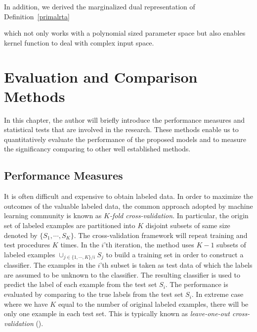 {In addition, we derived the marginalized dual representation of Definition~\ref{primalrta}
\iffalse
\begin{definition}{\bf $L_2$-norm RTA Marginalized Dual.}
	\begin{align*}
		\underset{\vmu\in\Mcal^m}{\maximize} &\quad \frac{1}{|E_\Tcal|}\sum_{e,k,\vu_e}\mu(k,e,\vu_e)   -\frac{1}{2}\sum_{\substack{e,k,\vu_e,\\k',\vu_e'}} \mu(k,e,\vu_e) K_\Tcal^e(x_k,\vu_e;x_k',\vu'_e) \mu(k',e,\vu'_e)\, ,
	\end{align*}
\end{definition}
\fi
which not only works with a polynomial sized parameter space but also enables kernel function to deal with complex input space.



%
\chapter{Evaluation and Comparison Methods} \label{ch_ecm}

In this chapter, the author will briefly introduce the performance measures and statistical tests that are involved in the research. 
These methods enable us to quantitatively evaluate the performance of the proposed models and to measure the significancy comparing to other well established methods.

%
\section{Performance Measures} \label{sc_pm}

It is often difficult and expensive to obtain labeled data. 
In order to maximize the outcomes of the valuable labeled data, the common approach adopted by machine learning community is known as \textit{$K$-fold cross-validation}.
In particular, the origin set of labeled examples are partitioned into $K$ disjoint subsets of same size denoted by $\{S_1,\cdots,S_K\}$.
The cross-validation framework will repeat training and test procedures $K$ times.
In the $i$'th iteration, the method uses $K-1$ subsets of labeled examples $\cup_{j\in\{1,\cdots,K\}/i}S_j$ to build a training set in order to construct a classifier.
The examples in the $i$'th subset is taken as test data of which the labels are assumed to be unknown to the classifier.
The resulting classifier is used to predict the label of each example from the test set $S_i$.
The performance is evaluated by comparing to the true labels from the test set $S_i$.
In extreme case where we have $K$ equal to the number of original labeled examples, there will be only one example in each test set.
This is typically known as \textit{leave-one-out cross-validation} (\loo).

}
